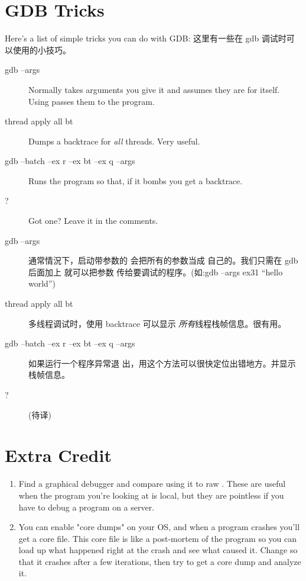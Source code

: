 \begin{enumerate}
\section{GDB Tricks}

Here's a list of simple tricks you can do with GDB:
这里有一些在 gdb 调试时可以使用的小技巧。
\begin{description}
\item[gdb --args] Normally  takes arguments you give it
    and assumes they are for itself.  Using  passes them to 
    the program.
\item[thread apply all bt] Dumps a backtrace for \emph{all} threads.  Very useful.
\item[gdb --batch --ex r --ex bt --ex q --args] Runs the program so that, if it
    bombs you get a backtrace.
\item[?] Got one? Leave it in the comments.
\end{description}

\begin{description}
\item[gdb --args] 通常情況下，启动带参数的  会把所有的参数当成
  自己的。我们只需在 gdb 后面加上  就可以把参数
  传给要调试的程序。(如:gdb --args ex31 ``hello world'')
\item[thread apply all bt] 多线程调试时，使用 backtrace 可以显示
  \emph{所有}线程栈帧信息。很有用。
\item[gdb --batch --ex r --ex bt --ex q --args] 如果运行一个程序异常退
  出，用这个方法可以很快定位出错地方。并显示栈帧信息。
\item[?] (待译)
\end{description}

\section{Extra Credit}

\begin{enumerate}
\item Find a graphical debugger and compare using it to raw .
    These are useful when the program you're looking at is local, but they
    are pointless if you have to debug a program on a server.
\item You can enable "core dumps" on your OS, and when a program crashes
    you'll get a core file.  This core file is like a post-mortem of
    the program so you can load up what happened right at the crash
    and see what caused it.  Change  so that it crashes
    after a few iterations, then try to get a core dump and analyze it.
\end{enumerate}


\end{enumerate}
